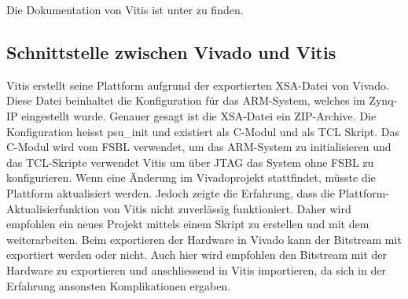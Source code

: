 Die Dokumentation von Vitis ist unter  zu finden.

\subsection{Schnittstelle zwischen Vivado und Vitis}
Vitis erstellt seine Plattform aufgrund der exportierten XSA-Datei von Vivado. Diese Datei beinhaltet die Konfiguration für das ARM-System, welches im Zynq-IP eingestellt wurde. Genauer gesagt ist die XSA-Datei ein ZIP-Archive. Die Konfiguration heisst psu\_init und existiert als C-Modul und als TCL Skript. Das C-Modul wird vom FSBL verwendet, um das ARM-System zu initialisieren und das TCL-Skripte verwendet Vitis um über JTAG das System ohne FSBL zu konfigurieren. 
Wenn eine Änderung im Vivadoprojekt stattfindet, müsste die Plattform aktualisiert werden. Jedoch zeigte die Erfahrung, dass die Plattform-Aktualisierfunktion von Vitis nicht zuverlässig funktioniert. Daher wird empfohlen ein neues Projekt mittels einem Skript zu erstellen und mit dem weiterarbeiten. Beim exportieren der Hardware in Vivado kann der Bitstream mit exportiert werden oder nicht. Auch hier wird empfohlen den Bitstream mit der Hardware zu exportieren und anschliessend in Vitis importieren, da sich in der Erfahrung ansonsten Komplikationen ergaben.
